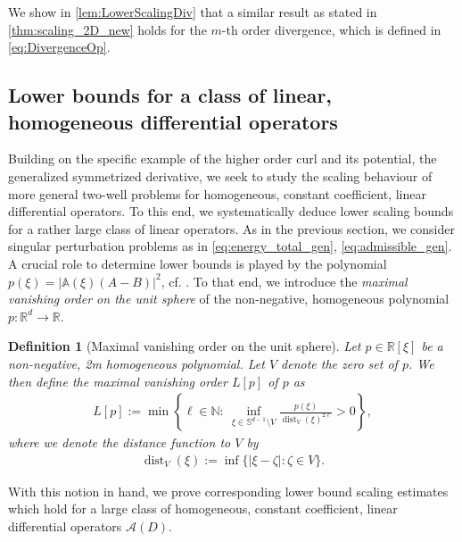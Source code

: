 \documentclass[a4paper, 10pt, twoside, notitlepage]{amsart}
\theoremstyle{plain}
\newtheorem{defi}[prop]{Definition}
\newcommand{\R}{\mathbb{R}}
\newcommand{\N}{\mathbb{N}}
\newcommand{\A}{\mathcal{A}}
\renewcommand{\AA}{\mathbb{A}}
\DeclareMathOperator{\dist}{dist}
\begin{document}
        We show in \cref{lem:LowerScalingDiv} that a similar result as stated in \cref{thm:scaling_2D_new} holds for the $m$-th order divergence, which is defined in \cref{eq:DivergenceOp}.
                  
	
	\subsection{Lower bounds for a class of linear, homogeneous differential operators}
	Building on the specific example of the higher order curl and its potential, the generalized symmetrized derivative, we seek to study the scaling behaviour of more general two-well problems for homogeneous, constant coefficient,
	linear differential operators. To this end, we systematically deduce lower scaling bounds for a rather large class of linear operators. As in the previous section, we consider singular perturbation problems as in \cref{eq:energy_total_gen},
	\cref{eq:admissible_gen}. A crucial role to determine lower bounds is played by the polynomial $p(\xi) = |\AA(\xi)(A-B)|^2$, cf. \cite[Corollary 3.2]{RRT23}.	
	To that end, we introduce the \emph{maximal vanishing order on the unit sphere} of the non-negative, homogeneous polynomial $p:\R^d \to \R$.
	
	\begin{defi}[Maximal vanishing order on the unit sphere]
		\label{defi:index}
		Let $p \in \R[\xi]$ be a non-negative, 2m homogeneous polynomial. Let $V$ denote the zero set of $p$. We then define the \emph{maximal vanishing order} $L[p]$ of $p$ as
		\begin{align*}
			L[p]:= \min\left\{\ell \in \N: \ \inf\limits_{\xi \in \mathbb{S}^{d-1} \setminus V} \frac{p(\xi)}{\dist_V(\xi)^{2\ell}}>0 \right\},
		\end{align*}
                where we denote the distance function to $V$ by
                  \begin{align}
                  \label{eq:dist}
                    \dist_V(\xi) := \inf \{|\xi- \zeta|: \zeta \in V\}.
                  \end{align}                  
	\end{defi}
	
	With this notion in hand, we prove corresponding lower bound scaling estimates which hold for a large class of homogeneous, constant coefficient, linear differential operators $\A(D)$.
	
\end{document}
